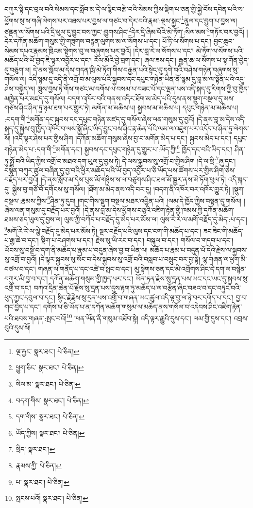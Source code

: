 བཀུར་སྟི་དང་བྲལ་བའི་སེམས་དང་སློབ་མ་དེ་ལ་སྙིང་བརྩེ་བའི་སེམས་ཀྱིས་སྡིག་པ་ཅན་གྱི་སྐྱེ་བོས་དབེན་པའི་ས་ཕྱོགས་སུ་ས་གཞི་ལེགས་པར་འཐས་པར་བྱས་ལ་གཙང་བ་དེར་བའི་རྣམ་:ལྔས་སྐྱང་\footnote{ལྔ་རྐྱང་  སྣར་ཐང་།  པེ་ཅིན། }ནུལ་དང་བྱུག་པ་བྱས་ལ། ཙནྡན་ལ་སོགས་པའི་དྲི་ཕུལ་དུ་བྱུང་བས་ཀྱང་:བྱུགས་ཤིང་\footnote{ཕྱུག་ཅིང་  སྣར་ཐང་།  པེ་ཅིན། }དེར་དྲི་ཞིམ་པོའི་མེ་ཏོག་:སིལ་མས་\footnote{སིལ་མ་  སྣར་ཐང་།  པེ་ཅིན། }གཏོར་བར་བྱའོ། །དེར་དཀོན་མཆོག་གསུམ་གྱི་གཟུགས་བརྙན་ལུགས་མ་ལ་སོགས་པ་དང་། པོ་ཏི་ལ་སོགས་པ་དང་། བྱང་ཆུབ་སེམས་དཔའ་རྣམས་ཁྲིའམ་སྟེགས་བུ་ལ་བཞུགས་པར་བྱའོ། །དེར་བླ་རེ་ལ་སོགས་པ་དང་། མེ་ཏོག་ལ་སོགས་པའི་མཆོད་པའི་ཡོ་བྱད་ཇི་ལྟར་འབྱོར་པ་དང་། རོལ་མོའི་བྱེ་བྲག་དང་། ཞལ་ཟས་དང་། རྒྱན་ཆ་ལ་སོགས་པ་སྟ་གོན་བྱེད་དུ་བཅུག་ལ། དེ་ནས་སློབ་མ་དེས་གདན་ཁྲི་མེ་ཏོག་གིས་བརྒྱན་པའི་སྟེང་དུ་དགེ་བའི་བཤེས་གཉེན་བཞུགས་སུ་གསོལ་ལ། འདི་སྙམ་དུ་འདི་ནི་འགྲོ་བ་མ་ལུས་པའི་སྐྱབས་དང་དཔུང་གཉེན་ཡིན་ནོ་སྙམ་དུ་བླ་མ་ལ་སྟོན་པའི་འདུ་ཤེས་བསྐྱེད་ལ། ཁྲུས་བྱས་ཏེ་གོས་གཙང་མ་བགོས་ལ་བསམ་པ་བཟང་པོ་དང་ལྡན་པས་འདི་སྐད་དུ་རིགས་ཀྱི་བུ་ཁྱོད་མཁྱེན་པར་མཛད་དུ་གསོལ། བདག་འཁོར་བའི་གནས་འདིར་ཐོག་མ་མེད་པའི་དུས་ནས་སྡུག་བསྔལ་དུ་མས་གཙེས་ཤིང་ཤིན་ཏུ་ཉམ་ཐག་པར་གྱུར་ཏེ། མགོན་མ་མཆིས་པ། སྐྱབས་མ་མཆིས་པ། དཔུང་གཉེན་མ་མཆིས་པ། :བདག་གི་\footnote{བདག་གིས་  སྣར་ཐང་།  པེ་ཅིན། }མགོན་དང་སྐྱབས་དང་དཔུང་གཉེན་མཛད་དུ་གསོལ་ཞེས་ལན་གསུམ་དུ་བྱའོ། །དེ་ནས་བླ་མ་དེས་འདི་སྐད་དུ་སྐྱེས་བུ་ཁྱོད་འཁོར་བ་ལས་སྐྱོ་ཞིང་ཡིད་བྱུང་བས་ཤིང་རྟ་ཆེན་པོའི་ལམ་ལ་འཇུག་པར་འདོད་པ་ཤིན་ཏུ་ལེགས་སོ། །འདི་ལྟར་ཤེས་པར་གྱིས་ཤིག །དཀོན་མཆོག་གསུམ་ཞེས་བྱ་བ་མགོན་མེད་པ་དང་། སྐྱབས་མེད་པ་དང་། དཔུང་གཉེན་མེད་པ་:དག་གི་\footnote{དག་གིས་  སྣར་ཐང་།  པེ་ཅིན། }མགོན་དང་། སྐྱབས་དང་དཔུང་གཉེན་དུ་གྱུར་པ་:ཡོད་ཀྱི།\footnote{ཡོད་ཀྱིས།  སྣར་ཐང་།  པེ་ཅིན། } ཁྱོད་དང་བའི་ཡིད་དང་། ཤིན་ཏུ་སྤྲོ་བའི་ཡིད་ཀྱིས་འགྲོ་བ་མཐའ་དག་ཡུལ་དུ་བྱས་ཏེ། དེ་ལས་སྐྱབས་སུ་འགྲོ་བ་གྱིས་ཤིག །དེ་ལ་སྲི་\footnote{སྲིད་  སྣར་ཐང་། }ཞུ་དང་། བསྙེན་བཀུར་ཚུལ་བཞིན་དུ་བྱ་བའི་ཕྱིར་མཆོད་པའི་ཡོ་བྱད་འབྱོར་པ་ཅི་ཡོད་པས་ཚོགས་པར་གྱིས་ཤིག་ཅེས་བརྗོད་པར་བྱའོ། །དེ་ནས་སློབ་མ་དེས་པུས་མོ་གཉིས་ས་ལ་བཙུགས་ཤིང་ཐལ་མོ་སྦྱར་ནས་མེ་ཏོག་ཕུལ་ཏེ། འདི་སྐད་དུ། སྐྱེས་བུ་གཙོ་བོ་དགོངས་སུ་གསོལ། །ཐོག་མ་མེད་ནས་འདི་བར་དུ། །བདག་ནི་འཁོར་བར་འཁོར་གྱུར་ཏེ། །སྡུག་བསྔལ་:རྣམས་ཀྱིས་\footnote{རྣམས་ཀྱི་  པེ་ཅིན། }ཤིན་ཏུ་དུབ། །གང་གིས་སྡུག་བསྔལ་མཐར་འབྱིན་པའི། །ལམ་དེ་ཁྱོད་ཀྱིས་བསྟན་དུ་གསོལ། །ཞེས་ལན་གསུམ་དུ་བརྗོད་པར་བྱའོ། །དེ་ནས་བླ་མ་དེས་ཕྱོགས་བཅུའི་འཇིག་རྟེན་གྱི་ཁམས་ཀྱི་དཀོན་མཆོག་ཐམས་ཅད་ཡུལ་དུ་བྱས་ལ། ལུས་ཀྱི་བཀོད་པ་བརྗོད་དུ་མེད་པར་མོས་ལ། ལུས་རེ་རེ་ལ་མགོ་བརྗོད་དུ་མེད་:པ་དང་། \footnote{པ་  སྣར་ཐང་།  པེ་ཅིན། }མགོ་རེ་རེ་ལ་ལྕེ་བརྗོད་དུ་མེད་པར་མོས་ཏེ། སྔར་བརྗོད་པའི་ལུས་དང་ངག་གི་མཆོད་པ་དང་། ཟང་ཟིང་གི་མཆོད་པ་རྒྱ་ཆེ་བ་དང་། སྡིག་པ་བཤགས་པ་དང་། རྗེས་སུ་ཡི་རང་བ་དང་། བསྐུལ་བ་དང་། གསོལ་བ་གདབ་པ་དང་། ཡོངས་སུ་བསྔོ་བ་དག་ནི་མཆོད་པ་རྣམ་པ་བདུན་ཞེས་བྱ་བ་ཡིན་ལ། མཆོད་པ་རྣམ་པ་བདུན་པོ་དེའི་རྗེས་ལ་སྐྱབས་སུ་འགྲོ་བ་བྱའོ། །དེ་ལྟར་སྐྱབས་སུ་སོང་བ་དེས་སྐྱབས་སུ་འགྲོ་བའི་བསླབ་པ་བསྲུང་བར་བྱ་སྟེ། ལྷ་གཞན་ལ་ཕྱག་མི་བཙལ་བ་དང་། གཞན་ལ་གནོད་པ་དང་འཚེ་བ་སྤང་བ་དང་། མུ་སྟེགས་ཅན་དང་མི་འགྲོགས་ཤིང་དེ་དག་ལ་བསྙེན་བཀུར་མི་བྱ་བ་དང་། དཀོན་མཆོག་གསུམ་གྱི་ཁྱད་པར་དང་། ཡོན་ཏན་རྗེས་སུ་དྲན་པས་ཡང་དང་ཡང་དུ་སྐྱབས་སུ་འགྲོ་བ་དང་། བཀའ་དྲིན་ཆེན་པོ་རྗེས་སུ་དྲན་པས་དུས་རྟག་ཏུ་མཆོད་པ་ལ་བརྩོན་ཞིང་བཟའ་བ་དང་བཏུང་བའི་ཕུད་ཀྱང་དབུལ་བ་དང་། སྙིང་རྗེ་རྗེས་སུ་དྲན་པས་འགྲོ་བ་གཞན་ཡང་ཚུལ་འདི་ལྟ་བུ་ལ་ཉེ་བར་དགོད་པ་དང་། བྱ་བ་གང་བྱེད་པ་དང་། དགོས་པ་ཅི་ཡོད་པ་ན་དཀོན་མཆོག་གསུམ་ལ་མཆོད་ནས་གསོལ་བ་འདེབས་ཤིང་འཇིག་རྟེན་པའི་ཐབས་གཞན་:སྤང་བའོ།\footnote{སྤངས་པའོ།  སྣར་ཐང་།  པེ་ཅིན། } །ཕན་ཡོན་ནི་གསུམ་འཐོབ་སྟེ། འདི་ལྟར་རྒྱུའི་དུས་དང་། ལམ་གྱི་དུས་དང་། འབྲས་བུའི་དུས་སོ། 